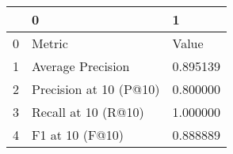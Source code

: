 \begin{tabular}{lll}
\toprule
 & 0 & 1 \\
\midrule
0 & Metric & Value \\
1 & Average Precision & 0.895139 \\
2 & Precision at 10 (P@10) & 0.800000 \\
3 & Recall at 10 (R@10) & 1.000000 \\
4 & F1 at 10 (F@10) & 0.888889 \\
\bottomrule
\end{tabular}
